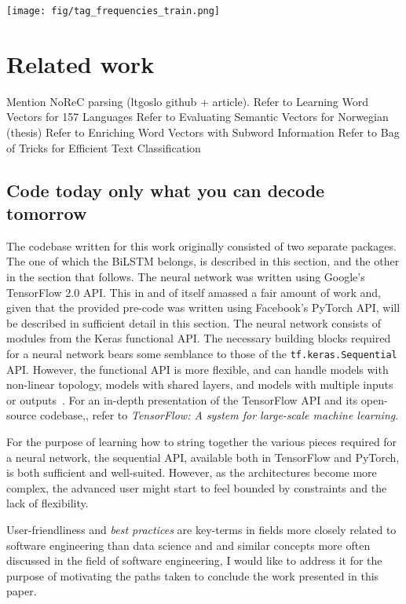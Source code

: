 \documentclass{acl2020}
\begin{document}
\medskip
\texttt{[image: fig/tag\_frequencies\_train.png]}

\section{Related work}
\label{sec:background}

Mention NoReC parsing (ltgoslo github + article).
Refer to Learning Word Vectors for 157 Languages \citep{grave-etal-2018-learning}
Refer to Evaluating Semantic Vectors for Norwegian (thesis)
Refer to Enriching Word Vectors with Subword Information \citep{bojanowski-etal-2017-enriching}
Refer to Bag of Tricks for Efficient Text Classification \citep{joulin-etal-2017-bag}

\subsection{Code today only what you can decode tomorrow}
\label{subsec:baseline}

The codebase written for this work originally consisted of two separate packages. The one of which the BiLSTM belongs, is described in this section, and the other in the section that follows. The neural network was written using Google's TensorFlow 2.0 API. This in and of itself amassed a fair amount of work and, given that the provided pre-code was written using Facebook's PyTorch API, will be described in sufficient detail in this section.
The neural network consists of modules from the Keras functional API. The necessary building blocks required for a neural network bears some semblance to those of the {\small\verb|tf.keras.Sequential|} API. However, the functional API is more flexible, and can handle models with non-linear topology, models with shared layers, and models with multiple inputs or outputs~\citep{func-api}. For an in-depth presentation of the TensorFlow API and its open-source codebase,\citep{tensorflow2015-whitepaper}, refer to \emph{TensorFlow: A system for large-scale machine learning}.

For the purpose of learning how to string together the various pieces required for a neural network, the sequential API, available both in TensorFlow and PyTorch, is both sufficient and well-suited. However, as the architectures become more complex, the advanced user might start to feel bounded by constraints and the lack of flexibility.

User-friendliness and \emph{best practices} are key-terms in fields more closely related to software engineering than data science and and similar concepts  more often discussed in the field of software engineering, I would like to address it for the purpose of motivating the paths taken to conclude the work presented in this paper.
\end{document}
